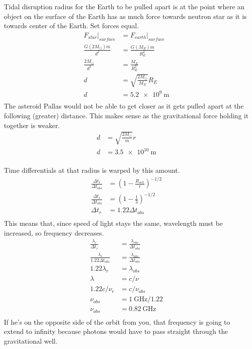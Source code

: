 \documentclass{homework}
\begin{document}
\maketitle


\question
Tidal disruption radius for the Earth to be pulled apart is at the point where an object on the surface of the Earth has as much force towards neutron star as it is towards center of the Earth. Set forces equal.
\begin{align*}
    F_{star}|_{surface}	&=	F_{earth}|_{surface}    \\
    \frac{G(2M_\odot)m}{d^2}    &=  \frac{G(M_E)m}{R_E^2}   \\
    \frac{2M_\odot}{d^2}    &=  \frac{M_E}{R_E^2}   \\
    d    &=	\sqrt{\frac{2M_\odot}{M_E}} R_E	\\
    d    &=	\boxed{\SI{5.2e9}{\metre}}	\\
\end{align*}
The asteroid Pallas would not be able to get closer as it gets pulled apart at the following (greater) distance. This makes sense as the gravitational force holding it together is weaker.
\begin{align*}
    d    &=	\sqrt{\frac{2M_\odot}{m}} r	\\
    d    &=	\boxed{\SI{3.5e10}{\metre}}	\\
\end{align*}

\newpage
\question
Time differentials at that radius is warped by this amount.
\begin{align*}
    \frac{\Delta t_r}{\Delta t_{obs}}	&=	\left( 1 - \frac{R_{sch}}{r} \right)^{-1/2}	\\
    \frac{\Delta t_r}{\Delta t_{obs}}	&=	\left( 1 - \frac{1}{3} \right)^{-1/2}	\\
    \Delta t_r &=   1.22 \Delta t_{obs} \\
\end{align*}
This means that, since speed of light stays the same, wavelength must be increased, so frequency decreases.
\begin{align*}
    \frac{\lambda_r}{\Delta t_r}	&=  \frac{\lambda_{obs}}{\Delta t_{obs}}	\\
    \frac{\lambda_r}{1.22 \Delta t_{obs}}	&=  \frac{\lambda_{obs}}{\Delta t_{obs}}	\\
    1.22 \lambda_r    &= \lambda_{obs}	\\
    \lambda    &=	c/\nu	\\
    1.22 c/\nu_r    &= c/\nu_{obs}	\\
    \nu_{obs}    &=	\SI{1}{\giga\hertz} / 1.22	\\
    \nu_{obs}    &=	\boxed{\SI{0.82}{\giga\hertz}}	\\
\end{align*}
If he's on the opposite side of the orbit from you, that frequency is going to extend to infinity because photons would have to pass straight through the gravitational well.
\end{document}
